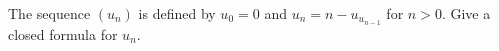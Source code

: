 The sequence $(u_n)$ is defined by $u_0 = 0$ and $u_n = n - u_{u_{n-1}}$ for $n > 0$. Give a closed formula for $u_n$.
